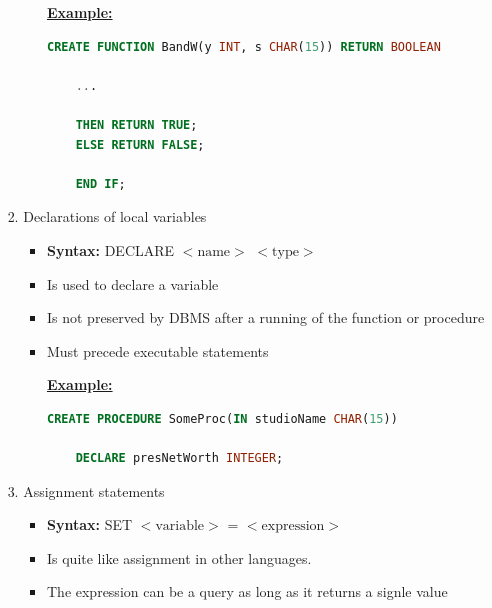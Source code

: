 \documentclass[12pt]{article}
\begin{document}
\begin{enumerate}[1.]
\begin{enumerate}[a)]
\begin{itemize}
\begin{enumerate}[1.]
\begin{itemize}
                    \bigskip

                    \underline{\textbf{Example:}}

                    \bigskip

    \begin{lstlisting}[language=SQL]
    CREATE FUNCTION BandW(y INT, s CHAR(15)) RETURN BOOLEAN

    ...

    THEN RETURN TRUE;
    ELSE RETURN FALSE;

    END IF;
    \end{lstlisting}

                \end{itemize}
                \item Declarations of local variables
                \begin{itemize}
                    \item \textbf{Syntax:} DECLARE $<\text{name}>$ $<\text{type}>$
                    \item Is used to declare a variable
                    \item Is not preserved by DBMS after a running of the function or procedure
                    \item Must precede executable statements

                    \bigskip

                    \underline{\textbf{Example:}}

                    \bigskip

    \begin{lstlisting}[language=SQL]
    CREATE PROCEDURE SomeProc(IN studioName CHAR(15))

    DECLARE presNetWorth INTEGER;
    \end{lstlisting}

                \end{itemize}
                \item Assignment statements
                \begin{itemize}
                    \item \textbf{Syntax:} SET $<\text{variable}>$ = $<\text{expression}>$
                    \item Is quite like assignment in other languages.
                    \item The expression can be a query as long as it returns a signle value

                    \bigskip


\end{itemize}
\end{enumerate}
\end{itemize}
\end{enumerate}
\end{enumerate}
\end{document}
